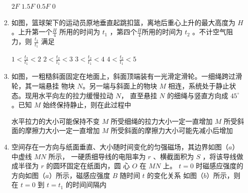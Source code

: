 \begin{enumerate}
\begin{figure}[h!]
\centering

\end{figure}

\fourchoices
{$ 2F $}
{$ 1.5F $}
{$ 0.5F $}
{$ 0 $}

\banswer{

}


\item
如图，篮球架下的运动员原地垂直起跳扣篮，离地后重心上升的最大高度为 $ H $ 。上升第一个$\frac{H}{4}$
所用的时间为 $ t_{1} $ ，第四个$\frac{H}{4}$所用的时间为 $ t_{2} $ 。不计空气阻力，则 $\frac{t_{2}}{t_{1}}$ 满足  

\begin{figure}[h!]
\centering

\end{figure}

\fourchoices
{$1<\frac{t_{2}}{t_{1}}<2$}
{$2<\frac{t_{2}}{t_{1}}<3$}
{$ 3<\frac{t_{2}}{t_{1}}<4$}
{$4<\frac{t_{2}}{t_{1}}<5$}

\banswer{

}

\newpage
\item
如图，一粗糙斜面固定在地面上，斜面顶端装有一光滑定滑轮。一细绳跨过滑轮，其一端悬挂
物块 $ N $。另一端与斜面上的物块 $ M $ 相连，系统处于静止状态。现用水平向左的拉力缓慢拉动 $ N $，
直至悬挂 $ N $ 的细绳与竖直方向成 $ 45 ^{ \circ } $。已知 $ M $ 始终保持静止，则在此过程中  

\begin{figure}[h!]
\centering

\end{figure}

\fourchoices
{水平拉力的大小可能保持不变}
{$ M $ 所受细绳的拉力大小一定一直增加}
{$ M $ 所受斜面的摩擦力大小一定一直增加}
{$ M $ 所受斜面的摩擦力大小可能先减小后增加}

\banswer{

}


\item
空间存在一方向与纸面垂直、大小随时间变化的匀强磁场，其边界如图（$ a $）中虚线 $ MN $ 所示，
一硬质细导线的电阻率为 $ r $ 、横截面积为 $ S $ ，将该导线做成半径为 $ r $ 的圆环固定在纸面内，圆
心 $ O $ 在 $ MN $ 上。 $ t=0 $ 时磁感应强度的方向如图（$ a $）所示，磁感应强度 $ B $ 随时间 $ t $ 的变化关系
如图（$ b $）所示，则在 $ t=0 $ 到 $ t= t_{1} $ 的时间间隔内  

\begin{figure}[h!]
\centering

\end{figure}



\end{enumerate}
